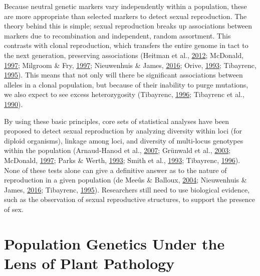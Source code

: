 \documentclass[double,11pt]{beavtex}
\begin{document}
  Because neutral genetic markers vary independently within a population,
  these are more appropriate than selected markers to detect sexual
  reproduction. The theory behind this is simple; sexual reproduction
  breaks up associations between markers due to recombination and
  independent, random assortment. This contrasts with clonal reproduction,
  which transfers the entire genome in tact to the next generation,
  preserving associations (Heitman et al.,
  \protect\hyperlink{ref-heitman2012evolution}{2012}; McDonald,
  \protect\hyperlink{ref-mcdonald1997population}{1997}; Milgroom \& Fry,
  \protect\hyperlink{ref-milgroom1997contributions}{1997}; Nieuwenhuis \&
  James, \protect\hyperlink{ref-nieuwenhuis2016frequency}{2016}; Orive,
  \protect\hyperlink{ref-orive1993effective}{1993}; Tibayrenc,
  \protect\hyperlink{ref-tibayrenc1995population}{1995}). This means that
  not only will there be significant associations between alleles in a
  clonal population, but because of their inability to purge mutations, we
  also expect to see excess heterozygosity (Tibayrenc,
  \protect\hyperlink{ref-tibayrenc1996towards}{1996}; Tibayrenc et al.,
  \protect\hyperlink{ref-tibayrenc1990clonal}{1990}).
  
  By using these basic principles, core sets of statistical analyses have
  been proposed to detect sexual reproduction by analyzing diversity
  within loci (for diploid organisms), linkage among loci, and diversity
  of multi-locus genotypes within the population (Arnaud-Hanod et al.,
  \protect\hyperlink{ref-arnaud2007standardizing}{2007}; Grünwald et al.,
  \protect\hyperlink{ref-grunwald2003analysis}{2003}; McDonald,
  \protect\hyperlink{ref-mcdonald1997population}{1997}; Parks \& Werth,
  \protect\hyperlink{ref-parks1993study}{1993}; Smith et al.,
  \protect\hyperlink{ref-smith1993how}{1993}; Tibayrenc,
  \protect\hyperlink{ref-tibayrenc1996towards}{1996}). None of these tests
  alone can give a definitive answer as to the nature of reproduction in a
  given population (de Meeûs \& Balloux,
  \protect\hyperlink{ref-de2004clonal}{2004}; Nieuwenhuis \& James,
  \protect\hyperlink{ref-nieuwenhuis2016frequency}{2016}; Tibayrenc,
  \protect\hyperlink{ref-tibayrenc1995population}{1995}). Researchers
  still need to use biological evidence, such as the observation of sexual
  reproductive structures, to support the presence of sex.
  
  \section{Population Genetics Under the Lens of Plant
  Pathology}\label{population-genetics-under-the-lens-of-plant-pathology}
  
\end{document}
